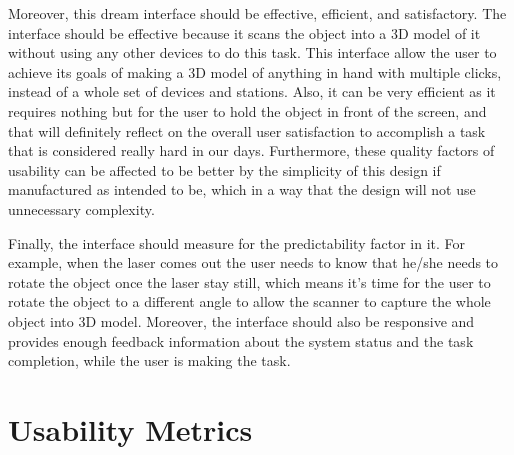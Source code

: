 \documentclass[12pt, oneside]{amsart}   	%
\begin{document}
Moreover, this dream interface should be effective, efficient, and satisfactory.
The interface should be effective because it scans the object into a 3D model of it without using any other devices to do this task. This interface allow the user to achieve its goals of making a 3D model of anything in hand with multiple clicks, instead of a whole set of devices and stations.  Also, it can be very efficient as it requires nothing but for the user to hold the object in front of the screen, and that will definitely reflect on the overall user satisfaction to accomplish a task that is considered really hard in our days.  Furthermore, these quality factors of usability can be affected to be better by the simplicity of this design if manufactured as intended to be, which in a way that the design will not use unnecessary complexity. 

Finally, the interface should measure for the predictability factor in it.  For example, when the laser comes out the user needs to know that he/she needs to rotate the object once the laser stay still, which means it's time for the user to rotate the object to a different angle to allow the scanner to capture the whole object into 3D model.
Moreover, the interface should also be responsive and provides enough feedback information about the system status and the task completion, while the user is making the task.
\section{Usability Metrics}
\end{document}
